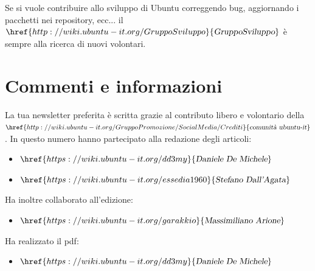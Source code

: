 \documentclass[a4paper,twoside]{article}
\begin{document}
Se si vuole contribuire allo sviluppo di Ubuntu correggendo bug, aggiornando i pacchetti nei repository, ecc... il $\href{http://wiki.ubuntu-it.org/GruppoSviluppo}{\textsl{GruppoSviluppo}}$ è sempre alla ricerca di nuovi volontari.

\section{Commenti e informazioni}
La tua newsletter preferita è scritta grazie al contributo libero e volontario della $\href{http://wiki.ubuntu-it.org/GruppoPromozione/SocialMedia/Crediti}{\textsl{comunità ubuntu-it}}$. In questo numero hanno partecipato alla redazione degli articoli:

\begin{itemize}
\item $\href{https://wiki.ubuntu-it.org/dd3my}{\textsl{Daniele De Michele}}$
\item $\href{https://wiki.ubuntu-it.org/essedia1960}{\textsl{Stefano Dall'Agata}}$
\end{itemize}

Ha inoltre collaborato all'edizione:

\begin{itemize}
\item $\href{https://wiki.ubuntu-it.org/garakkio}{\textsl{Massimiliano Arione}}$
\end{itemize}

Ha realizzato il pdf:

\begin{itemize}
\item $\href{https://wiki.ubuntu-it.org/dd3my}{\textsl{Daniele De Michele}}$
\end{itemize}
\end{document}
